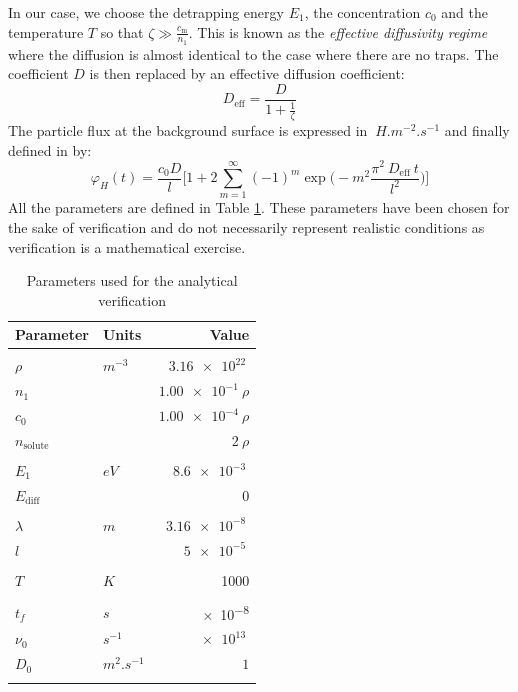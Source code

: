 In our case, we choose the detrapping energy $E_1$, the concentration $c_0$ and the temperature $T$ so that $\zeta \gg \frac{c_\mathrm{m}}{n_1}$.
This is known as the \textit{effective diffusivity regime} where the diffusion is almost identical to the case where there are no traps.
The coefficient $D$ is then replaced by an effective diffusion coefficient:
\begin{equation}
    D_\mathrm{eff} = \frac{D}{1+\frac{1}{\zeta}}
\end{equation}
The particle flux at the background surface is expressed in $\SI{}{H.m^{-2}.s^{-1}}$ and finally defined in  by:
\begin{equation}
    \varphi_H(t) = \frac{c_0 D}{l}\bigg[1+2\sum_{m=1}^{\infty}(-1)^m \exp\bigg(-m^2\frac{\pi^2 \:D_\mathrm{eff} \: t}{l^2}\bigg)\bigg]
\label{eq:flux analytical}
\end{equation}
All the parameters are defined in Table \ref{tab:parameters analytical verification}.
These parameters have been chosen for the sake of verification and do not necessarily represent realistic conditions as verification is a mathematical exercise.
\begin{table}
    \centering
    \begin{tabular}{p{2.3cm} p{2cm} r}
        Parameter & Units & Value \\
        \hline
        \\
        $\rho$ & $\si{m^{-3}}$ &$\SI{3.16e22}{}$ \\
        $n_1$ & & $\SI{1.00e-1}{} \rho$ \\
        $c_0$ & & $\SI{1.00e-4}{} \rho$\\
        $n_\mathrm{solute}$ & & $2 \:\rho$\\
        \\
        $E_1$ & $\si{eV}$ & $\SI{8.6e-3}{}$ \\
        $E_\mathrm{diff}$ & & $0$ \\
        \\
        $\lambda$ & $\si{m}$ & $\SI{3.16e-8}{}$  \\
        $l$ & & $\SI{5e-5}{}$\\
        \\
        $T$ & $\si{K}$ & 1000 \\
        \\
        $t_f$ & $\si{s}$ & \SI{e-8}{} \\
        $\nu_0$ & $\si{s^{-1}}$ & $\SI{e13}{}$ \\
        $D_0$ & $\si{m^2.s^{-1}}$ & $1$ \\
        \\
    \end{tabular}
    \caption{Parameters used for the analytical verification}
    \label{tab:parameters analytical verification}
\end{table}
